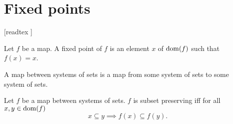 \documentclass[../../set-theory/set-theory.tex]{subfiles}
\begin{document}
  \chapter{Fixed points}\label{chapter:fixed-points}


  \begin{forthel}

    [readtex ]

  \end{forthel}


  \begin{forthel}
    \begin{definition}
      Let $f$ be a map.
      A fixed point of $f$ is an element $x$ of $\operatorname{dom}(f)$ such that $f(x) = x$.
    \end{definition}
  \end{forthel}

  \begin{forthel}
    \begin{definition}
      A map between systems of sets is a map from some system of sets to some
      system of sets.
    \end{definition}
  \end{forthel}

  \begin{forthel}
    \begin{definition}
      Let $f$ be a map between systems of sets.
      $f$ is subset preserving iff for all $x, y \in \operatorname{dom}(f)$
      \[ x \subseteq y \implies f(x) \subseteq f(y). \]
    \end{definition}
  \end{forthel}
\end{document}
